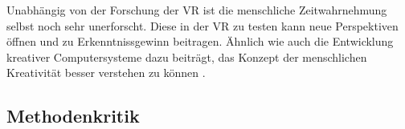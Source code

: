 \documentclass{Bericht}
\begin{document}
Unabhängig von der Forschung der VR ist die menschliche Zeitwahrnehmung selbst noch sehr unerforscht. Diese in der VR zu testen kann neue Perspektiven öffnen und zu Erkenntnissgewinn beitragen. Ähnlich wie auch die Entwicklung kreativer Computersysteme dazu beiträgt,  das Konzept der menschlichen Kreativität besser verstehen zu können \cite{comp}.


\label{subsec:kritik}
\subsection{Methodenkritik}
\end{document}
